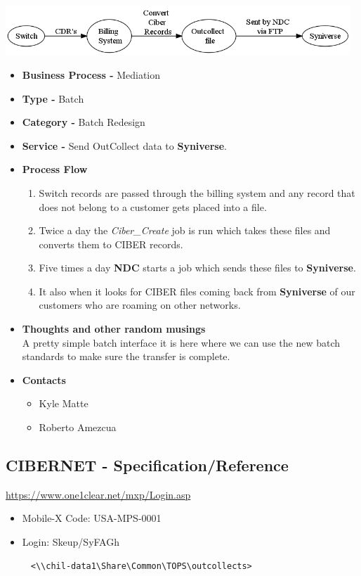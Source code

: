 \documentclass[12pt,twoside]{article}
\begin{document}
    \includegraphics[width=13cm]{Pictures/outcoll.png}
\begin{itemize}
\item \textbf{Business Process -} Mediation
\item \textbf{Type -} Batch
\item \textbf{Category -} Batch Redesign
\item \textbf{Service -}  Send OutCollect data to \textbf{Syniverse}.
\item \textbf{Process Flow}
\begin{enumerate}
\item Switch records are passed through the billing system and any
        record that does not belong to a customer gets placed into a file.
\item Twice a day the \emph{Ciber\_Create} job is run which takes these
        files and converts them to CIBER records.
\item Five times a day \textbf{NDC} starts a job which sends these files to
        \textbf{Syniverse}.
\item It also when it looks for CIBER files coming back from
        \textbf{Syniverse} of our customers who are roaming on other networks.
\end{enumerate}
\item \textbf{Thoughts and other random musings} \\ A pretty simple batch
     interface it is here where we can use the new batch standards to
     make sure the transfer is complete.
\item \textbf{Contacts}
\begin{itemize}
\item Kyle Matte
\item Roberto Amezcua
\end{itemize}
\end{itemize}
\subsection{CIBERNET - Specification/Reference}
\label{sec-6-9}

   \href{https://www.one1clear.net/mxp/Login.asp}{https://www.one1clear.net/mxp/Login.asp}
\begin{itemize}
\item Mobile-X Code: USA-MPS-0001
\item Login: Skeup/SyFAGh
\end{itemize}
\begin{verbatim}
     <\\chil-data1\Share\Common\TOPS\outcollects>
\end{verbatim}
\newpage
\end{document}
